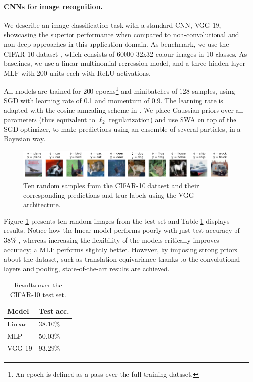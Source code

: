 \paragraph{CNNs for image recognition.}\label{kkvision}

We describe an image classification task with a standard CNN, VGG-19, showcasing the superior performance when compared to non-convolutional and non-deep approaches in this application domain. As benchmark, we use the CIFAR-10 dataset \cite{krizhevsky2014cifar},
which consists of 60000 32x32 colour images in 10 classes. As baselines, we use a linear multinomial regression model, and a three hidden layer MLP with 200 units each with ReLU activations.

All models are trained for 200 epochs\footnote{An epoch is defined as a pass over the full training dataset.} and minibatches of 128 samples, using SGD with learning rate of 0.1 and  momentum of 0.9.
The learning rate is adapted with the cosine annealing scheme in  \cite{loshchilov2016sgdr}. We place Gaussian priors over all parameters (thus equivalent to $\ell_2$ regularization) and use SWA on top of the SGD optimizer, to make predictions using an ensemble of several particles, in a Bayesian way.

\begin{figure}[hbt]
\centering
  \includegraphics[width=1.\linewidth]{figures/cifar.png}
  \caption{Ten random samples from the CIFAR-10 dataset and their corresponding predictions and true labels using the VGG architecture.}
  \label{fig:cifar}
\end{figure}

Figure \ref{fig:cifar} presents ten random images from the test set
and Table \ref{tab:cnn} displays results. Notice how the linear model performs poorly with just test accuracy of 38\% , whereas increasing the flexibility of the models critically improves 
accuracy; a MLP performs slightly better.
However, by imposing strong priors about the dataset, such as translation equivariance thanks to the convolutional layers and pooling, state-of-the-art results are achieved.

\begin{table}[ht]
\caption{Results over the CIFAR-10 test set.}
\centering
\begin{tabular}{ll}
Model & Test acc. \\
\hline
Linear &  $38.10\%$ \\
MLP &  $50.03\%$\\
VGG-19 &  $93.29\%$ 
\end{tabular}
\label{tab:cnn}
\end{table}

